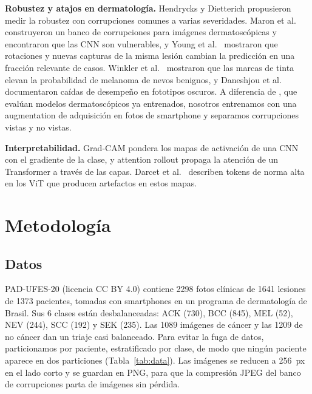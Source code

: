 \documentclass[conference]{IEEEtran}
\newcommand{\tab}[1]{}
\begin{document}
\textbf{Robustez y atajos en dermatología.} Hendrycks y Dietterich \cite{hendrycks2019} propusieron medir la robustez con corrupciones comunes a varias severidades. Maron et al.\ \cite{maron2021} construyeron un banco de corrupciones para imágenes dermatoscópicas y encontraron que las CNN son vulnerables, y Young et al.\ \cite{young2021} mostraron que rotaciones y nuevas capturas de la misma lesión cambian la predicción en una fracción relevante de casos. Winkler et al.\ \cite{winkler2019} mostraron que las marcas de tinta elevan la probabilidad de melanoma de nevos benignos, y Daneshjou et al.\ \cite{daneshjou2022} documentaron caídas de desempeño en fototipos oscuros. A diferencia de \cite{maron2021,young2021}, que evalúan modelos dermatoscópicos ya entrenados, nosotros entrenamos con una augmentation de adquisición en fotos de smartphone y separamos corrupciones vistas y no vistas.

\textbf{Interpretabilidad.} Grad-CAM \cite{selvaraju2017} pondera los mapas de activación de una CNN con el gradiente de la clase, y attention rollout \cite{abnar2020} propaga la atención de un Transformer a través de las capas. Darcet et al.\ \cite{darcet2024} describen tokens de norma alta en los ViT que producen artefactos en estos mapas.

\section{Metodología}
\label{sec:method}

\subsection{Datos}
PAD-UFES-20 \cite{pacheco2020pad} (licencia CC BY 4.0) contiene 2298 fotos clínicas de 1641 lesiones de 1373 pacientes, tomadas con smartphones en un programa de dermatología de Brasil. Sus 6 clases están desbalanceadas: ACK (730), BCC (845), MEL (52), NEV (244), SCC (192) y SEK (235). Las 1089 imágenes de cáncer y las 1209 de no cáncer dan un triaje casi balanceado. Para evitar la fuga de datos, particionamos por paciente, estratificado por clase, de modo que ningún paciente aparece en dos particiones (Tabla~\ref{tab:data}). Las imágenes se reducen a 256~px en el lado corto y se guardan en PNG, para que la compresión JPEG del banco de corrupciones parta de imágenes sin pérdida.

\tab{data}
\end{document}
